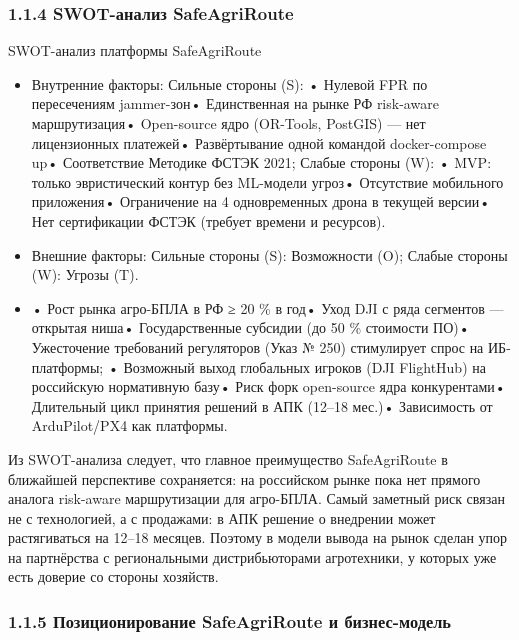 \documentclass[14pt,a4paper]{extarticle}
\begin{document}
\hypertarget{swot-ux430ux43dux430ux43bux438ux437-safeagriroute}{%
\subsubsection{1.1.4 SWOT-анализ SafeAgriRoute}\label{swot-ux430ux43dux430ux43bux438ux437-safeagriroute}}

SWOT-анализ платформы SafeAgriRoute
\begin{itemize}
\item Внутренние факторы: Сильные стороны (S): • Нулевой FPR по пересечениям jammer-зон• Единственная на рынке РФ risk-aware маршрутизация• Open-source ядро (OR-Tools, PostGIS) — нет лицензионных платежей• Развёртывание одной командой docker-compose up• Соответствие Методике ФСТЭК 2021; Слабые стороны (W): • MVP: только эвристический контур без ML-модели угроз• Отсутствие мобильного приложения• Ограничение на 4 одновременных дрона в текущей версии• Нет сертификации ФСТЭК (требует времени и ресурсов).
\item Внешние факторы: Сильные стороны (S): Возможности (O); Слабые стороны (W): Угрозы (T).
\item • Рост рынка агро-БПЛА в РФ ≥ 20 \% в год• Уход DJI с ряда сегментов — открытая ниша• Государственные субсидии (до 50 \% стоимости ПО)• Ужесточение требований регуляторов (Указ № 250) стимулирует спрос на ИБ-платформы; • Возможный выход глобальных игроков (DJI FlightHub) на российскую нормативную базу• Риск форк open-source ядра конкурентами• Длительный цикл принятия решений в АПК (12–18 мес.)• Зависимость от ArduPilot/PX4 как платформы.
\end{itemize}


Из SWOT-анализа следует, что главное преимущество SafeAgriRoute в ближайшей перспективе сохраняется: на российском рынке пока нет прямого аналога risk-aware маршрутизации для агро-БПЛА. Самый заметный риск связан не с технологией, а с продажами: в АПК решение о внедрении может растягиваться на 12--18 месяцев. Поэтому в модели вывода на рынок сделан упор на партнёрства с региональными дистрибьюторами агротехники, у которых уже есть доверие со стороны хозяйств.

\hypertarget{ux43fux43eux437ux438ux446ux438ux43eux43dux438ux440ux43eux432ux430ux43dux438ux435-safeagriroute-ux438-ux431ux438ux437ux43dux435ux441-ux43cux43eux434ux435ux43bux44c}{%
\subsubsection{1.1.5 Позиционирование SafeAgriRoute и бизнес-модель}\label{ux43fux43eux437ux438ux446ux438ux43eux43dux438ux440ux43eux432ux430ux43dux438ux435-safeagriroute-ux438-ux431ux438ux437ux43dux435ux441-ux43cux43eux434ux435ux43bux44c}}
\end{document}
